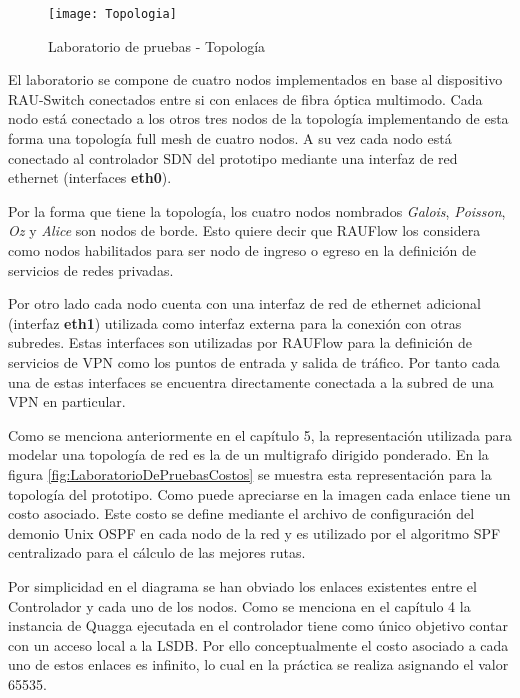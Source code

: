 \begin{figure}[ht!] 
\centering    
\texttt{[image: Topologia]}
\caption[Laboratorio de pruebas - Topolog\'ia]{Laboratorio de pruebas - Topolog\'ia}
\label{fig:LaboratorioDePruebasTopo}
\end{figure}

El laboratorio se compone de cuatro nodos implementados en base al dispositivo RAU-Switch conectados entre si con enlaces de fibra \'optica multimodo. Cada nodo est\'a conectado a los otros tres nodos de la topolog\'ia implementando de esta forma una topolog\'ia full mesh de cuatro nodos. A su vez cada nodo est\'a conectado al controlador SDN del prototipo mediante una interfaz de red ethernet (interfaces \textbf{eth0}).

Por la forma que tiene la topolog\'ia, los cuatro nodos nombrados \textit{Galois}, \textit{Poisson}, \textit{Oz} y \textit{Alice} son nodos de borde. Esto quiere decir que RAUFlow los considera como nodos habilitados para ser nodo de ingreso o egreso en la definici\'on de servicios de redes privadas.

Por otro lado cada nodo cuenta con una interfaz de red de ethernet adicional (interfaz \textbf{eth1}) utilizada como interfaz externa para la conexi\'on con otras subredes. Estas interfaces son utilizadas por RAUFlow para la definici\'on de servicios de VPN como los puntos de entrada y salida de tr\'afico. Por tanto cada una de estas interfaces se encuentra directamente conectada a la subred de una VPN en particular.

Como se menciona anteriormente en el cap\'itulo 5, la representaci\'on utilizada para modelar una topolog\'ia de red es la de un multigrafo dirigido ponderado. En la figura \ref{fig:LaboratorioDePruebasCostos} se muestra esta representaci\'on para la topolog\'ia del prototipo. Como puede apreciarse en la imagen cada enlace tiene un costo asociado. Este costo se define mediante el archivo de configuraci\'on del demonio Unix OSPF en cada nodo de la red y es utilizado por el algoritmo SPF centralizado para el c\'alculo de las mejores rutas.

Por simplicidad en el diagrama se han obviado los enlaces existentes entre el Controlador y cada uno de los nodos. Como se menciona en el cap\'itulo 4 la instancia de Quagga ejecutada en el controlador tiene como \'unico objetivo contar con un acceso local a la LSDB. Por ello conceptualmente el costo asociado a cada uno de estos enlaces es infinito, lo cual en la pr\'actica se realiza asignando el valor 65535.  

